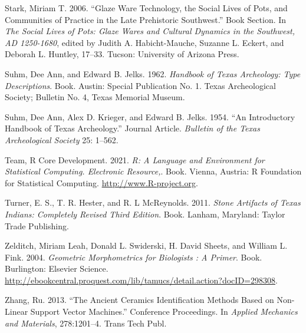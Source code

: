 \documentclass[smallextended]{svjour3}       %
\newlength{\cslhangindent}
\newlength{\cslentryspacingunit} %
\newenvironment{CSLReferences}[2] %
 {%
  \setlength{\parindent}{0pt}
  \ifodd #1
  \let\oldpar\par
  \def\par{\hangindent=\cslhangindent\oldpar}
  \fi
  \setlength{\parskip}{#2\cslentryspacingunit}
 }%
 {}
\begin{document}
\begin{CSLReferences}{1}{0}
\leavevmode{}%
Stark, Miriam T. 2006. {``{Glaze Ware Technology, the Social Lives of
Pots, and Communities of Practice in the Late Prehistoric Southwest}.''}
Book Section. In \emph{The Social Lives of Pots: Glaze Wares and
Cultural Dynamics in the Southwest, AD 1250-1680}, edited by Judith A.
Habicht-Mauche, Suzanne L. Eckert, and Deborah L. Huntley, 17--33.
Tucson: University of Arizona Press.

\leavevmode{}%
Suhm, Dee Ann, and Edward B. Jelks. 1962. \emph{{Handbook of Texas
Archeology: Type Descriptions}}. Book. Austin: Special Publication No.
1. Texas Archeological Society; Bulletin No. 4, Texas Memorial Museum.

\leavevmode{}%
Suhm, Dee Ann, Alex D. Krieger, and Edward B. Jelks. 1954. {``{An
Introductory Handbook of Texas Archeology}.''} Journal Article.
\emph{Bulletin of the Texas Archeological Society} 25: 1--562.

\leavevmode{}%
Team, R Core Development. 2021. \emph{R: A Language and Environment for
Statistical Computing. Electronic Resource,}. Book. Vienna, Austria: R
Foundation for Statistical Computing. \url{http://www.R-project.org}.

\leavevmode{}%
Turner, E. S., T. R. Hester, and R. L McReynolds. 2011. \emph{Stone
Artifacts of Texas Indians: Completely Revised Third Edition}. Book.
Lanham, Maryland: Taylor Trade Publishing.

\leavevmode{}%
Zelditch, Miriam Leah, Donald L. Swiderski, H. David Sheets, and William
L. Fink. 2004. \emph{Geometric Morphometrics for Biologists : A Primer}.
Book. Burlington: Elsevier Science.
\url{http://ebookcentral.proquest.com/lib/tamucs/detail.action?docID=298308}.

\leavevmode{}%
Zhang, Ru. 2013. {``The Ancient Ceramics Identification Methods Based on
Non-Linear Support Vector Machines.''} Conference Proceedings. In
\emph{Applied Mechanics and Materials}, 278:1201--4. Trans Tech Publ.

\end{CSLReferences}




\end{document}
